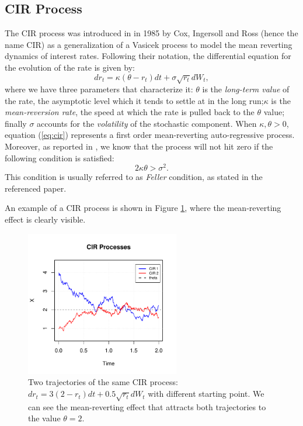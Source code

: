 \subsection{CIR Process}
The CIR process was introduced in \citep{CIR85} in 1985 by Cox, Ingersoll and Ross (hence the name CIR) as a generalization of a Vasicek process \citep{VASICEK77} to model the mean reverting dynamics of interest rates.
Following their notation, the differential equation for the  evolution of the rate is given by:
\begin{equation}
\label{eq:cir}
	dr_t = \kappa(\theta - r_t) dt + \sigma \sqrt{r_t}dW_t,
\end{equation}
where we have three parameters that characterize it: $\theta$ is the \textit{long-term value} of the rate, the asymptotic level which it tends to settle at in the long run;$\kappa$ is the \textit{mean-reversion rate}, the speed at which the rate is pulled back to the $\theta$ value; finally $\sigma$ accounts for the \textit{volatility} of the stochastic component.
When $\kappa,\theta >0$, equation (\ref{eq:cir}) represents a first order mean-reverting auto-regressive process. Moreover, as reported in \citep{HESTONTRAP}, we know that the process will not hit zero if the following condition is satisfied:
\begin{equation}
	2\kappa\theta > \sigma^2.
\end{equation}
This condition is usually referred to as \textit{Feller} condition, as stated in the referenced paper.

An example of a CIR process is shown in Figure \ref{fig:cir_proc}, where the mean-reverting effect is  clearly visible.

\begin{figure}
	\centering
	\includegraphics[width=0.6\textwidth]{Images/cir_process.pdf}
	\caption[Trajectories of two CIR processes]{Two trajectories of the same CIR process: $dr_t = 3(2 - r_t) dt + 0.5 \sqrt{r_t}dW_t$ with different starting point. We can see the mean-reverting effect that attracts both trajectories to the value $\theta=2$. }
	\label{fig:cir_proc}
\end{figure}

